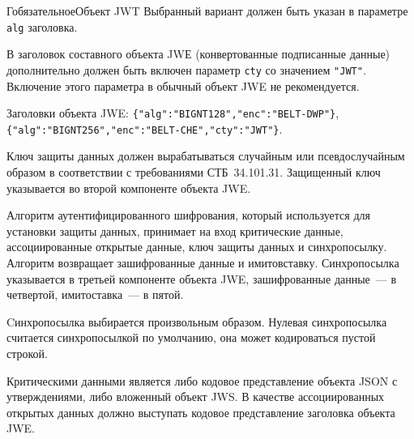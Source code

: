 \begin{appendix}{Г}{обязательное}{Объект JWT}
Выбранный вариант должен быть указан в параметре \lstinline{alg} заголовка. 

В заголовок составного объекта JWЕ (конвертованные подписанные данные) 
дополнительно должен быть включен параметр \lstinline{cty} со значением 
\lstinline{"JWT"}. 
%
Включение этого параметра в обычный объект JWE не рекомендуется.

\begin{example*}
Заголовки объекта JWE: 
\lstinline|{"alg":"BIGNT128","enc":"BELT-DWP"}|,
\lstinline|{"alg":"BIGNT256","enc":"BELT-CHE","cty":"JWT"}|.
\end{example*}

Ключ защиты данных должен вырабатываться случайным или псевдослучайным образом 
в соответствии с требованиями СТБ~34.101.31.
%
Защищенный ключ указывается во второй компоненте объекта JWE.

Алгоритм аутентифицированного шифрования, который используется для установки 
защиты данных, принимает на вход критические данные, ассоциированные открытые 
данные, ключ защиты данных и синхропосылку. Алгоритм возвращает зашифрованные 
данные и имитовставку.
%
Синхропосылка указывается в третьей компоненте объекта JWE, зашифрованные 
данные~--- в четвертой, имитоставка~--- в пятой.

Cинхропосылка выбирается произвольным образом.
%
Нулевая синхропосылка считается синхропосылкой по умолчанию, она может 
кодироваться пустой строкой.

Критическими данными является либо кодовое представление объекта JSON с 
утверждениями, либо вложенный объект JWS. 
%
В качестве ассоциированных открытых данных должно выступать кодовое 
представление заголовка объекта JWE.

\end{appendix}
